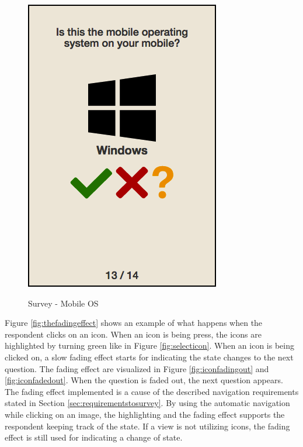 \begin{figure}[H]
{        \includegraphics[scale=0.34]{pics/survey/windows}
      }
      \caption{Survey - Mobile OS}
      \label{fig:mobileOSquestion}
    \end{figure}
    \clearpage

    Figure \ref{fig:thefadingeffect} shows an example of what happens when the respondent clicks on an icon. When an icon is being press, the icons are highlighted by turning green like in Figure \ref{fig:selecticon}. When an icon is being clicked on, a slow fading effect starts for indicating the state changes to the next question. The fading effect are visualized in Figure \ref{fig:iconfadingout} and \ref{fig:iconfadedout}. When the question is faded out, the next question appears. The fading effect implemented is a cause of the described navigation requirements stated in Section \ref{sec:requirementstosurvey}. By using the automatic navigation while clicking on an image, the highlighting and the fading effect supports the respondent keeping track of the state. If a view is not utilizing icons, the fading effect is still used for indicating a change of state.

